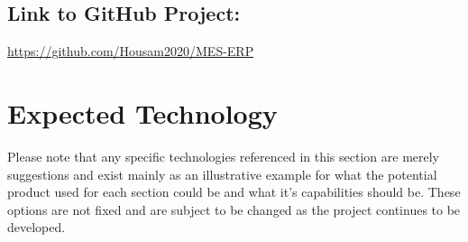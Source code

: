 \documentclass{article}
\begin{document}
\subsection{Link to GitHub Project:} \href{https://github.com/Housam2020/MES-ERP}{https://github.com/Housam2020/MES-ERP} \\
\section{Expected Technology}

Please note that any specific technologies referenced in this section are merely suggestions and exist mainly as an illustrative example for what the potential product used for each section could be and what it's capabilities should be. These options are not fixed and are subject to be changed as the project continues to be developed.
\end{document}

